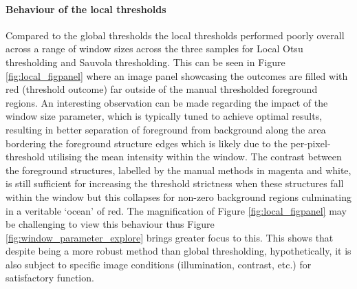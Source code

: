 \paragraph{Behaviour of the local thresholds}
Compared to the global thresholds the local thresholds performed poorly overall across a range of window sizes across the three samples for Local Otsu thresholding and Sauvola thresholding. This can be seen in Figure \ref{fig:local_figpanel} where an image panel showcasing the outcomes are filled with red (threshold outcome) far outside of the manual thresholded foreground regions. An interesting observation can be made regarding the impact of the window size parameter, which is typically tuned to achieve optimal results, resulting in better separation of foreground from background along the area bordering the foreground structure edges which is likely due to the per-pixel-threshold utilising the mean intensity within the window. The contrast between the foreground structures, labelled by the manual methods in magenta and white, is still sufficient for increasing the threshold strictness when these structures fall within the window but this collapses for non-zero background regions culminating in a veritable `ocean' of red. The magnification of Figure \ref{fig:local_figpanel} may be challenging to view this behaviour thus Figure \ref{fig:window_parameter_explore} brings greater focus to this. This shows that despite being a more robust method than global thresholding, hypothetically, it is also subject to specific image conditions (illumination, contrast, etc.) for satisfactory function. 


